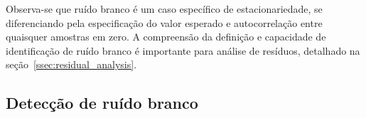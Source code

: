 Observa-se que ruído branco é um caso específico de estacionariedade, se
diferenciando pela especificação do valor esperado e autocorrelação entre
quaisquer amostras em zero. A compreensão da definição e capacidade de
identificação de ruído branco é importante para análise de resíduos, detalhado
na seção~\ref{ssec:residual_analysis}.

\subsection{Detecção de ruído branco}
